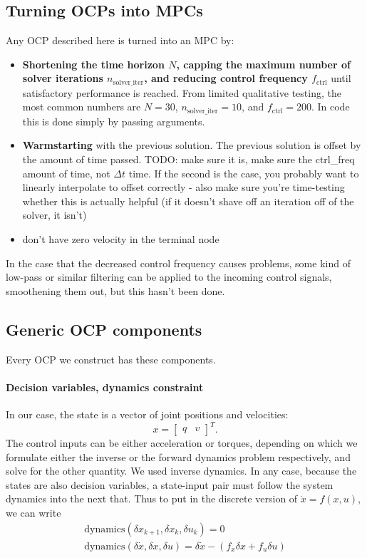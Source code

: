 \subsection{Turning OCPs into MPCs}
Any OCP described here is turned into an MPC by:
\begin{itemize}
\item \textbf{Shortening the time horizon $ N  $, capping the maximum number of
solver iterations $ n_{ \text{solver\_iter} }  $, 
and reducing control frequency $ f_{ \text{ctrl} }  $}
until satisfactory performance is reached. 
From limited qualitative testing, the most common numbers
are $ N = 30  $, $  n_{ \text{solver\_iter} } = 10   $,
and $ f_{ \text{ctrl} } = 200  $. In code this is done simply by passing arguments.
\item \textbf{Warmstarting} with the previous solution. 
		The previous solution is offset by the amount of time passed.
		TODO: make sure it is, make sure the ctrl\_freq amount of time, 
		not $ \Delta t  $ time. If the second is the case,
		you probably want to linearly interpolate to offset correctly
		- also make sure you're time-testing whether this is actually helpful
		(if it doesn't shave off an iteration off of the solver,
		it isn't)
\item don't have zero velocity in the terminal node
\end{itemize}
In the case that the decreased control frequency causes problems,
some kind of low-pass or similar filtering can be applied
to the incoming control signals, smoothening them out,
but this hasn't been done.

\subsection{Generic OCP components}
Every OCP we construct has these components.
\paragraph{Decision variables, dynamics constraint}
In our case, the state is a vector of joint positions and velocities:
\begin{equation}
 x = \begin{bmatrix} q & v \end{bmatrix}^{ T }   .
\end{equation}
The control inputs can be either acceleration or torques, 
depending on which we formulate either the inverse or the forward dynamics
problem respectively, and solve for the other quantity.
We used inverse dynamics.
In any case, because the states are also decision variables,
a state-input pair must follow the system dynamics into the next that.
Thus to put in the discrete version of $ \dot{x}= f (x,u)    $, we can write
\begin{gather}
 \text{dynamics} ( \delta x_{ k+1 }, \delta  x_{ k }, \delta  u_{ k } ) =0 \\
 \text{dynamics} (\delta \dot{x}, \delta x, \delta u)=
\delta \dot{x} - (f_{ x } \delta x + f_{ u } \delta u)
\end{gather}

